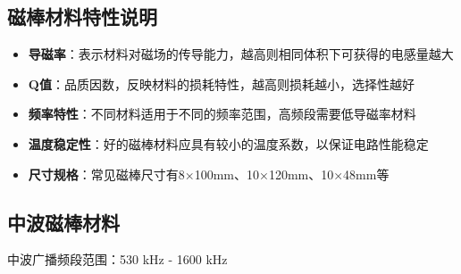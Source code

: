 \subsection{磁棒材料特性说明}
\label{sec:magnetic_materials_characteristics}

\begin{itemize}
  \item \textbf{导磁率}：表示材料对磁场的传导能力，越高则相同体积下可获得的电感量越大
  \item \textbf{Q值}：品质因数，反映材料的损耗特性，越高则损耗越小，选择性越好
  \item \textbf{频率特性}：不同材料适用于不同的频率范围，高频段需要低导磁率材料
  \item \textbf{温度稳定性}：好的磁棒材料应具有较小的温度系数，以保证电路性能稳定
  \item \textbf{尺寸规格}：常见磁棒尺寸有8×100mm、10×120mm、10×48mm等
\end{itemize}

\subsection{中波磁棒材料}
\label{sec:mw_magnetic_materials}

中波广播频段范围：530 kHz - 1600 kHz

